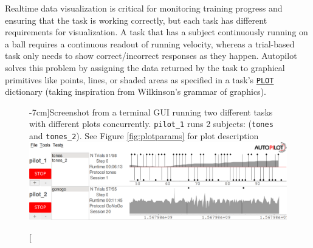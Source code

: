 Realtime data visualization is critical for monitoring training progress and ensuring that the task is working correctly, but each task has different requirements for visualization. A task that has a subject continuously running on a ball requires a continuous readout of running velocity, whereas a trial-based task only needs to show correct/incorrect responses as they happen. Autopilot solves this problem by assigning the data returned by the task to graphical primitives like points, lines, or shaded areas as specified in a task's \hyperref[sec:taskcomponents]{\texttt{PLOT}} dictionary (taking inspiration from Wilkinson's grammar of graphics\citep{wilkinsonGrammarGraphics2012}).%
%
\begin{figure}[hb!]
\caption[][-7cm]{Screenshot from a terminal GUI running two different tasks with different plots concurrently. \texttt{pilot\_1} runs 2 subjects: (\texttt{tones} and \texttt{tones\_2}). See Figure \ref{fig:plotparams} for plot description}
\label{fig:gui}
\includegraphics[]{figures/ss_3.png}
\end{figure}
\clearpage

